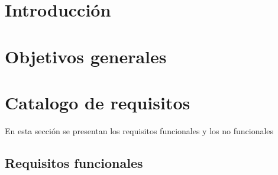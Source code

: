 
\section{Introducción}

\section{Objetivos generales}

\section{Catalogo de requisitos}
En esta sección se presentan los requisitos funcionales y los no funcionales
\subsection{Requisitos funcionales}\label{requisitos-funcionales}
